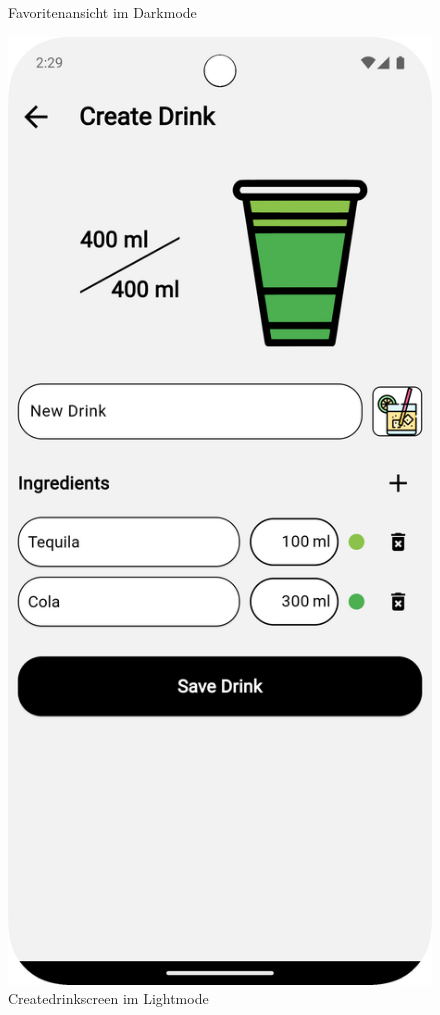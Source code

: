 \begin{figure}[H]
\begin{minipage}{0.27\textwidth}
        \caption{Favoritenansicht im Darkmode}
        \label{fig:favorites_dark}
    \end{minipage}
    \hfill
    \begin{minipage}{0.27\textwidth}
        \centering
        \includegraphics[width=\textwidth]{graphics/images/create_drink.png}
        \caption{Createdrinkscreen im Lightmode}
        \label{fig:create_drink}
    \end{minipage}
    \label{fig:favorites}
\end{figure}



